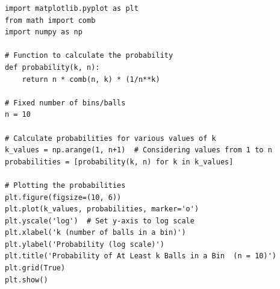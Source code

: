 \documentclass[14pt]{extreport}
\begin{document}
\begin{lstlisting}
      import matplotlib.pyplot as plt
      from math import comb
      import numpy as np
    
      # Function to calculate the probability
      def probability(k, n):
          return n * comb(n, k) * (1/n**k)
    
      # Fixed number of bins/balls
      n = 10
    
      # Calculate probabilities for various values of k
      k_values = np.arange(1, n+1)  # Considering values from 1 to n
      probabilities = [probability(k, n) for k in k_values]
    
      # Plotting the probabilities
      plt.figure(figsize=(10, 6))
      plt.plot(k_values, probabilities, marker='o')
      plt.yscale('log')  # Set y-axis to log scale
      plt.xlabel('k (number of balls in a bin)')
      plt.ylabel('Probability (log scale)')
      plt.title('Probability of At Least k Balls in a Bin  (n = 10)')
      plt.grid(True)
      plt.show()
\end{lstlisting}
\end{document}
